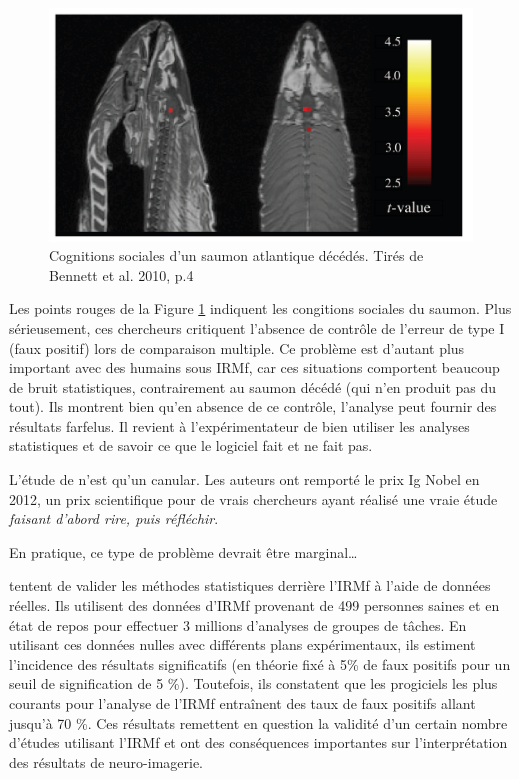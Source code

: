 \documentclass[
]{book}
\begin{document}
\begin{figure}

{\centering \includegraphics[width=0.75\linewidth]{image//saumon} 

}

\caption{Cognitions sociales d'un saumon atlantique décédés. Tirés de Bennett et al. 2010, p.4}\label{fig:saumon}
\end{figure}

Les points rouges de la Figure \ref{fig:saumon} indiquent les congitions sociales du saumon. Plus sérieusement, ces chercheurs critiquent l'absence de contrôle de l'erreur de type I (faux positif) lors de comparaison multiple. Ce problème est d'autant plus important avec des humains sous IRMf, car ces situations comportent beaucoup de bruit statistiques, contrairement au saumon décédé (qui n'en produit pas du tout). Ils montrent bien qu'en absence de ce contrôle, l'analyse peut fournir des résultats farfelus. Il revient à l'expérimentateur de bien utiliser les analyses statistiques et de savoir ce que le logiciel fait et ne fait pas.

L'étude de \textcite{Bennett10} n'est qu'un canular. Les auteurs ont remporté le prix Ig Nobel en 2012, un prix scientifique pour de vrais chercheurs ayant réalisé une vraie étude \emph{faisant d'abord rire, puis réfléchir}.

En pratique, ce type de problème devrait être marginal\ldots{}

\textcite{Eklund16} tentent de valider les méthodes statistiques derrière l'IRMf à l'aide de données réelles. Ils utilisent des données d'IRMf provenant de 499 personnes saines et en état de repos pour effectuer 3 millions d'analyses de groupes de tâches. En utilisant ces données nulles avec différents plans expérimentaux, ils estiment l'incidence des résultats significatifs (en théorie fixé à 5\% de faux positifs pour un seuil de signification de 5 \%). Toutefois, ils constatent que les progiciels les plus courants pour l'analyse de l'IRMf entraînent des taux de faux positifs allant jusqu'à 70 \%. Ces résultats remettent en question la validité d'un certain nombre d'études utilisant l'IRMf et ont des conséquences importantes sur l'interprétation des résultats de neuro-imagerie.
\end{document}
